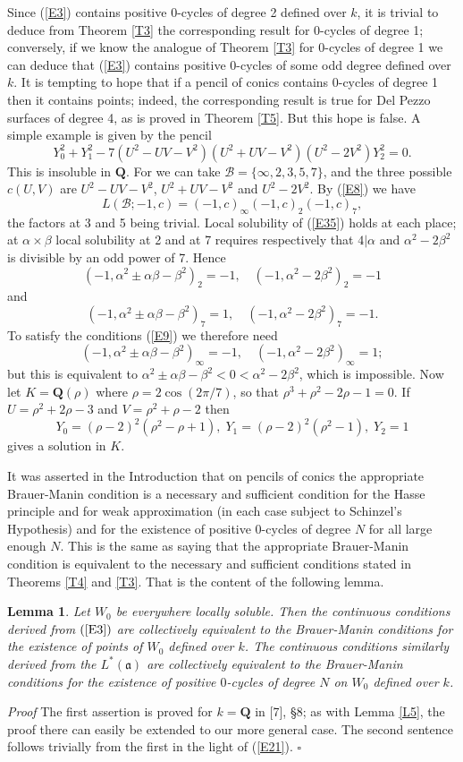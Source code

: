 \documentclass[12pt]{article}
\def\bQ{{\mathbf Q}}
\def\fa{{\mathfrak a}}
\def\ga{{\alpha}}
\def\gb{{\beta}}
\def\sB{{\mathcal B}}
\def\qed{{\hfill$\square$}}
\def\beq{\begin{equation} \label}
\def\ble{\begin{lemma} \label}
\def\ele{\end{lemma}}
\newtheorem{lemma}{Lemma}
\begin{document}
Since (\ref{E3}) contains positive 0-cycles of degree 2 defined over $k$, it
is trivial to deduce from Theorem \ref{T3} the corresponding result for
0-cycles of degree 1; conversely, if we know the analogue of Theorem
\ref{T3} for 0-cycles of degree 1 we can deduce that (\ref{E3}) contains
positive 0-cycles of some odd degree defined over $k$. It is tempting to hope
that if a pencil of conics
contains 0-cycles of degree 1 then it contains points; indeed, the
corresponding result is true for Del Pezzo surfaces of degree 4, as is proved
in Theorem \ref{T5}. But this hope
is false. A simple example is given by the pencil
\beq{E35} Y_0^2+Y_1^2-7(U^2-UV-V^2)(U^2+UV-V^2)(U^2-2V^2)Y^2_2=0.
\end{equation}
This is insoluble in $\bQ$. For we can take $\sB=\{\infty,2,3,5,7\}$, and the
three possible $c(U,V)$ are $U^2-UV-V^2$, $U^2+UV-V^2$ and $U^2-2V^2$. By
(\ref{E8}) we have
\[ L(\sB;-1,c)=(-1,c)_\infty(-1,c)_2(-1,c)_7, \]
the factors at 3 and 5 being trivial. Local solubility of (\ref{E35}) holds
at each place; at $\ga\times\gb$ local solubility at 2 and
at 7 requires respectively that $4|\ga$ and
$\ga^2-2\gb^2$ is divisible by an odd power of 7. Hence
\[ (-1,\ga^2\pm\ga\gb-\gb^2)_2=-1, \quad (-1,\ga^2-2\gb^2)_2=-1 \]
and
\[ (-1,\ga^2\pm\ga\gb-\gb^2)_7=1, \quad (-1,\ga^2-2\gb^2)_7=-1. \]
To satisfy the conditions (\ref{E9}) we therefore need
\[ (-1,\ga^2\pm\ga\gb-\gb^2)_\infty=-1, \quad (-1,\ga^2-2\gb^2)_\infty=1; \]
but this is equivalent to $\ga^2\pm\ga\gb-\gb^2<0<\ga^2-2\gb^2$, which is
impossible. Now let $K=\bQ(\rho)$ where $\rho=2\cos(2\pi/7)$, so that
$\rho^3+\rho^2-2\rho-1=0$. If $U=\rho^2+2\rho-3$ and $V=\rho^2+\rho-2$ then
\[ Y_0=(\rho-2)^2(\rho^2-\rho+1),\;Y_1=(\rho-2)^2(\rho^2-1),\;Y_2=1 \]
gives a solution in $K$.

\medskip

It was asserted in the Introduction that on pencils of conics the appropriate
Brauer-Manin condition is a
necessary and sufficient condition for the Hasse principle and for weak
approximation (in each case subject to Schinzel's Hypothesis) and for the
existence of
positive 0-cycles of degree $N$ for all large enough $N$. This is the same
as saying that the appropriate Brauer-Manin condition is equivalent to the
necessary and sufficient conditions stated in Theorems \ref{T4} and \ref{T3}.
That is the content of the following lemma.
\ble{L7} Let $W_0$ be everywhere locally soluble. Then the continuous
conditions derived from $(\ref{E3})$
are collectively equivalent to the Brauer-Manin conditions for the existence
of points of $W_0$ defined over $k$. The continuous conditions similarly
derived from the $L^*(\fa)$
are collectively equivalent to the Brauer-Manin conditions for the existence of
positive $0$-cycles of degree $N$ on $W_0$ defined over $k$.
\ele
\emph{Proof} The first assertion is proved for $k=\bQ$ in [7], \S8; as with
Lemma \ref{L5}, the proof there can easily be extended
to our more general case. The second sentence follows trivially from the
first in the light of (\ref{E21}).  \qed
\end{document}
